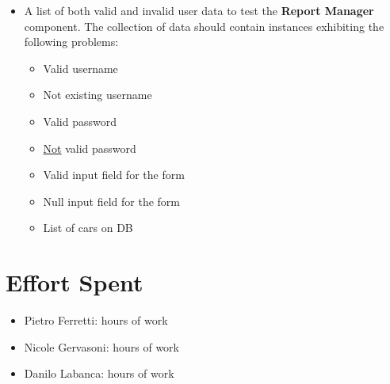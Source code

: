 \documentclass[english]{article}
\begin{document}
\begin{itemize}
    \item{A list of both valid and invalid user data to test the \textbf{Report Manager} component.
    The collection of data should contain instances exhibiting the following problems:
    \begin{itemize}
      \item{Valid username}
      \item{Not existing username}
      \item{Valid password}
      \item{\underline{Not} valid password}
      \item{Valid input field for the form}
      \item{Null input field for the form}
      \item{List of cars on DB}
    \end{itemize}}

\end{itemize}

\section{Effort Spent}
\begin{itemize}
	\item{Pietro Ferretti:  hours of work}
	\item{Nicole Gervasoni:  hours of work}
	\item{Danilo Labanca:  hours of work}
\end{itemize}
\end{document}
